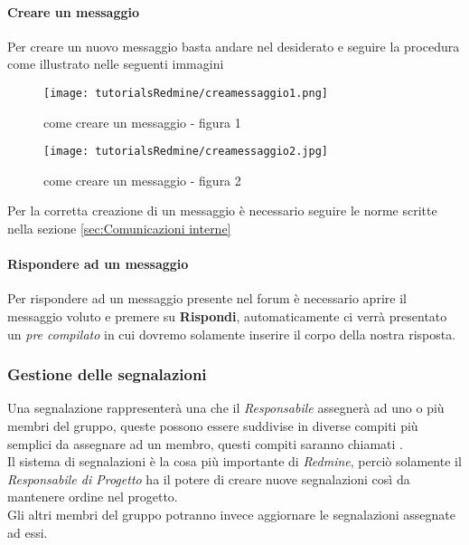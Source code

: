 \documentclass{scalatekids-article}
\begin{document}
\paragraph{Creare un messaggio}
Per creare un nuovo messaggio basta andare nel  desiderato e seguire la procedura come illustrato nelle seguenti immagini
\begin{figure}[H]
  \centering
  \texttt{[image: tutorialsRedmine/creamessaggio1.png]}
  \caption{come creare un messaggio - figura 1}
\end{figure}
\begin{figure}[H]
  \centering
  \texttt{[image: tutorialsRedmine/creamessaggio2.jpg]}
  \caption{come creare un messaggio - figura 2}
\end{figure}
Per la corretta creazione di un messaggio è necessario seguire le norme scritte nella sezione \ref{sec:Comunicazioni interne}
\paragraph{Rispondere ad un messaggio}
Per rispondere ad un messaggio presente nel forum è necessario aprire il messaggio voluto e premere su \textbf{Rispondi}, automaticamente ci verrà presentato un  \textit{pre compilato} in cui dovremo solamente inserire il corpo della nostra risposta.
\subsubsection{Gestione delle segnalazioni}
Una segnalazione rappresenterà una  che il \textit{Responsabile} assegnerà ad uno o più membri del gruppo, queste  possono essere suddivise in diverse compiti più semplici da assegnare ad un membro, questi compiti saranno chiamati .\\
Il sistema di segnalazioni è la cosa più importante di \textit{Redmine}, perciò solamente il \textit{Responsabile di Progetto} ha il potere di creare nuove segnalazioni così da mantenere ordine nel progetto. \\Gli altri membri del gruppo potranno invece aggiornare le segnalazioni assegnate ad essi.
\end{document}

